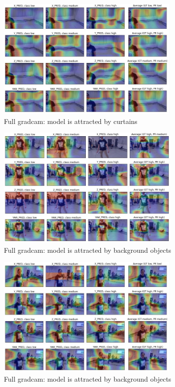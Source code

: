 \begin{figure}[!h]
\centering
\includegraphics[width=0.8\textwidth]{"contents/images/gradcam/apx-gradcam-4"}
\caption[]{Full \gls{gradcam}: model is attracted by curtains}
\label{fig:apx-gradcam-4}
\end{figure}

\begin{figure}[!h]
\centering
\includegraphics[width=0.8\textwidth]{"contents/images/gradcam/apx-gradcam-5"}
\caption[Full \gls{gradcam}: model is attracted by background objects]{Full \gls{gradcam}: model is attracted by background objects}
\label{fig:apx-gradcam-5}
\end{figure}

\begin{figure}[!h]
\centering
\includegraphics[width=0.8\textwidth]{"contents/images/gradcam/apx-gradcam-6"}
\caption[]{Full \gls{gradcam}: model is attracted by background objects}
\label{fig:apx-gradcam-6}
\end{figure}
